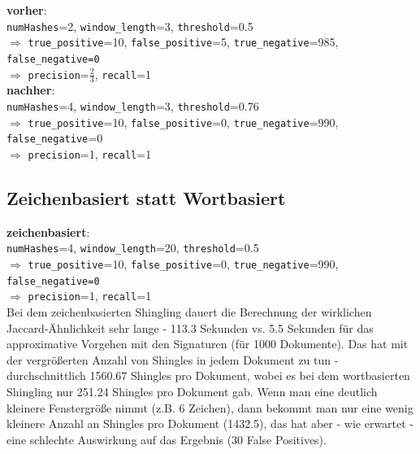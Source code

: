 \noindent
\textbf{vorher}: \\
\texttt{numHashes}=2, \texttt{window\_length}=3, \texttt{threshold}=0.5 \\
$\Rightarrow$ \texttt{true\_positive}=10, \texttt{false\_positive}=5, \texttt{true\_negative}=985, \texttt{false\_negative=0} \\
$\Rightarrow$ \texttt{precision}=$\frac{2}{3}$, \texttt{recall}=1 \\

\noindent
\textbf{nachher}: \\
\texttt{numHashes}=4, \texttt{window\_length}=3, \texttt{threshold}=0.76 \\
$\Rightarrow$ \texttt{true\_positive}=10, \texttt{false\_positive}=0, \texttt{true\_negative}=990, \texttt{false\_negative}=0 \\
$\Rightarrow$ \texttt{precision}=1, \texttt{recall}=1

\subsection{Zeichenbasiert statt Wortbasiert}

\textbf{zeichenbasiert}: \\
\texttt{numHashes}=4, \texttt{window\_length}=20, \texttt{threshold}=0.5 \\
$\Rightarrow$ \texttt{true\_positive}=10, \texttt{false\_positive}=0, \texttt{true\_negative}=990, \texttt{false\_negative=0} \\
$\Rightarrow$ \texttt{precision}=1, \texttt{recall}=1 \\

\noindent Bei dem zeichenbasierten Shingling dauert die Berechnung der wirklichen Jaccard-Ähnlichkeit sehr lange - 113.3 Sekunden vs. 5.5 Sekunden für das approximative Vorgehen mit den Signaturen (für 1000 Dokumente). Das hat mit der vergrößerten Anzahl von Shingles in jedem Dokument zu tun - durchschnittlich 1560.67 Shingles pro Dokument, wobei es bei dem wortbasierten Shingling nur 251.24 Shingles pro Dokument gab. Wenn man eine deutlich kleinere Fenstergröße nimmt (z.B. 6 Zeichen), dann bekommt man nur eine wenig kleinere Anzahl an Shingles pro Dokument (1432.5), das hat aber - wie erwartet - eine schlechte Auswirkung auf das Ergebnis (30 False Positives).
